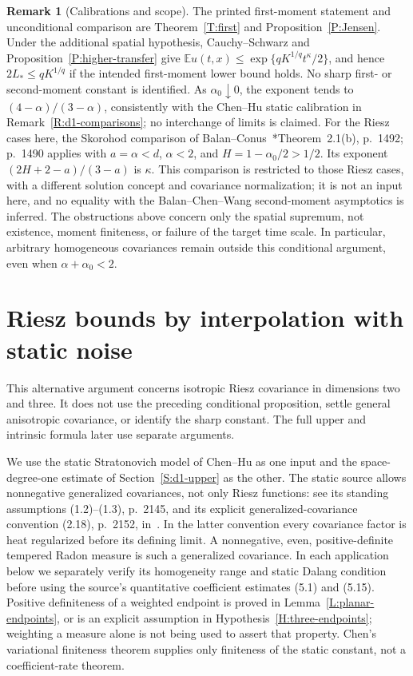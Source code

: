 \documentclass[12pt]{article}
\numberwithin{equation}{section}
\theoremstyle{definition}
\newtheorem{remark}[theorem]{Remark}
\newcommand{\E}{\mathbb{E}}
\begin{document}
\begin{remark}[Calibrations and scope]\label{R:higher-calibrations}
  The printed first-moment statement and unconditional comparison are
  Theorem~\ref{T:first} and Proposition~\ref{P:Jensen}. Under the
  additional spatial hypothesis, Cauchy--Schwarz and
  Proposition~\ref{P:higher-transfer} give
  $\E u(t,x)\le\exp\{qK^{1/q}t^\kappa/2\}$, and hence
  $2L_*\le qK^{1/q}$ if the intended first-moment lower bound holds.
  No sharp first- or second-moment constant is
  identified. As $\alpha_0\downarrow0$, the exponent tends to
  $(4-\alpha)/(3-\alpha)$, consistently with the Chen--Hu static
  calibration in Remark~\ref{R:d1-comparisons}; no interchange of limits
  is claimed. For the Riesz cases here, the Skorohod comparison of
  Balan--Conus~\cite{balan.conus:16:intermittency}*{Theorem~2.1(b),
  p.~1492; p.~1490} applies with $a=\alpha<d$, $\alpha<2$, and
  $H=1-\alpha_0/2>1/2$. Its exponent
  $(2H+2-a)/(3-a)$ is $\kappa$. This comparison is restricted to
  those Riesz cases, with a different solution concept and covariance
  normalization; it is not an input here, and no equality with the
  Balan--Chen--Wang second-moment asymptotics is inferred. The
  obstructions above concern only the spatial supremum, not existence,
  moment finiteness, or failure of the target time scale. In particular,
  arbitrary homogeneous covariances remain outside this conditional
  argument, even when $\alpha+\alpha_0<2$.
\end{remark}

\section{Riesz bounds by interpolation with static noise}
\label{S:static-holder}

This alternative argument concerns isotropic Riesz covariance in dimensions
two and three. It does not use the preceding conditional proposition,
settle general anisotropic covariance, or identify the sharp constant.
The full upper and intrinsic formula later use separate arguments.

We use the static Stratonovich model of Chen--Hu as one input and the
space-degree-one estimate of Section~\ref{S:d1-upper} as the other.
The static source allows nonnegative generalized covariances, not only
Riesz functions: see its standing assumptions (1.2)--(1.3), p.~2145,
and its explicit generalized-covariance convention (2.18), p.~2152,
in~\cite{chen.hu:25:hyperbolic}. In the latter convention every covariance
factor is heat regularized before its defining limit. A nonnegative,
even, positive-definite tempered Radon measure is such a generalized
covariance. In each application below we separately verify its homogeneity
range and static Dalang condition before using the source's quantitative
coefficient estimates (5.1) and (5.15). Positive definiteness of a weighted
endpoint is proved in Lemma~\ref{L:planar-endpoints}, or is an explicit
assumption in Hypothesis~\ref{H:three-endpoints}; weighting a measure alone
is not being used to assert that property. Chen's variational finiteness
theorem supplies only finiteness of the static constant, not a
coefficient-rate theorem.
\end{document}
